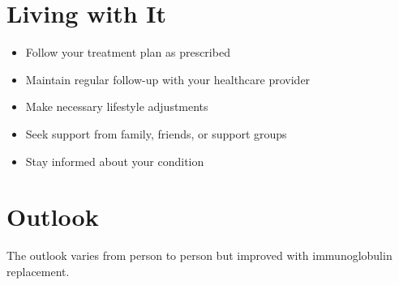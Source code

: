\section{Living with It}
\begin{itemize}[noitemsep]
  \item Follow your treatment plan as prescribed
  \item Maintain regular follow-up with your healthcare provider
  \item Make necessary lifestyle adjustments
  \item Seek support from family, friends, or support groups
  \item Stay informed about your condition
\end{itemize}
\section{Outlook}
The outlook varies from person to person but improved with immunoglobulin replacement.
